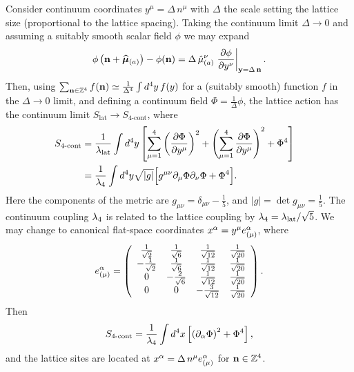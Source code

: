 Consider continuum coordinates $y^{\mu} = \Delta\, n^{\mu}$ with $\Delta$ the scale setting the lattice size (proportional to the lattice spacing).
Taking the continuum limit $\Delta \to 0$ and assuming a suitably smooth scalar field $\phi$ we may expand
\begin{equation}
  \phi\left(\mathbf{n} + \widehat{\boldsymbol{\mu}}_{(a)}\right) - \phi(\mathbf{n}) = \Delta\, \hat{\mu}_{(a)}^{\nu} \left. \frac{\partial \phi}{\partial y^{\nu}}\right|_{\mathbf{y} = \Delta\, \mathbf{n}}.
\end{equation}
Then, using $\sum_{\mathbf{n} \in \mathbb{Z}^4} f(\mathbf{n}) \simeq \frac{1}{\Delta^4} \int d^4 y\, f(y)$ for a (suitably smooth) function $f$ in the $\Delta \to 0$ limit, and defining a continuum field $\Phi = \frac{1}{\Delta} \phi$, the lattice action has the continuum limit $S_{\text{lat}} \to S_{\text{4-cont}}$, where
\begin{align}
  \label{eq:4dact1}
  S_{\text{4-cont}} & = \frac{1}{\lambda_{\text{lat}}} \int d^4 y \left[\sum_{\mu = 1}^4 \left(\frac{\partial \Phi}{\partial y^{\mu}}\right)^2 + \left(\sum_{\mu = 1}^4 \frac{\partial \Phi}{\partial y^{\mu}}\right)^2 + \Phi^4 \right] \cr
                    & = \frac{1}{\lambda_4} \int d^4 y \sqrt{|g|} \Big[g^{\mu\nu} \partial_{\mu} \Phi \partial_{\nu} \Phi + \Phi^4 \Big].
\end{align}
Here the components of the metric are $g_{\mu\nu} = \delta_{\mu\nu} - \frac{1}{5}$, and $|g| = \det{g_{\mu\nu}} = \frac{1}{5}$.
The continuum coupling $\lambda_4$ is related to the lattice coupling by $\lambda_4 = \lambda_{\text{lat}} / \sqrt{5}$.
We may change to canonical flat-space coordinates $x^{\alpha} = y^{\mu} e_{(\mu)}^{\alpha}$, where
\begin{equation}
  e_{(\mu)}^{\alpha} = \left(\begin{array}{cccc}
     \frac{1}{\sqrt{2}} &  \frac{1}{\sqrt{6}} &  \frac{1}{\sqrt{12}} & \frac{1}{\sqrt{20}} \\
    -\frac{1}{\sqrt{2}} &  \frac{1}{\sqrt{6}} &  \frac{1}{\sqrt{12}} & \frac{1}{\sqrt{20}} \\
     0                  & -\frac{2}{\sqrt{6}} &  \frac{1}{\sqrt{12}} & \frac{1}{\sqrt{20}} \\
     0                  &  0                  & -\frac{3}{\sqrt{12}} & \frac{1}{\sqrt{20}}
  \end{array}\right).
\end{equation}
Then
\begin{equation}
  \label{eq:4dact2}
  S_{\text{4-cont}} = \frac{1}{\lambda_4} \int d^4 x \left[\left(\partial_{\alpha} \Phi\right)^2 + \Phi^4 \right],
\end{equation}
and the lattice sites are located at $x^{\alpha} = \Delta\, n^{\mu} e_{(\mu)}^{\alpha}$ for $\mathbf{n} \in \mathbb{Z}^4$.
